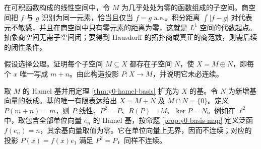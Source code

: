 \begin{example}[商空间消除积分中的代表元歧义]
在可积函数构成的线性空间中，令 $M$ 为几乎处处为零的函数组成的子空间。商空间把 $f$ 与 $g$ 识别为同一元素，恰当且仅当 $f=g$ a.e.。积分距离 $\int|f-g|$ 对代表元不敏感，并且在商空间中只有零元素的距离为零，这就是 $L^1$ 空间的代数起点。抽象商空间无需子空间闭；要得到 Hausdorff 的拓扑商或真正的商范数，则需后续的闭性条件。
\end{example}

\begin{exercise}[代数补空间与投影]
假设选择公理。证明每个子空间 $M\subseteq X$ 都存在子空间 $N$，使 $X=M\oplus N$，即每个 $x$ 唯一写成 $m+n$。由此构造投影 $P:X\to M$，并说明它未必连续。
\end{exercise}
\begin{solution}
取 $M$ 的 Hamel 基并用定理 \ref{thm:y0-hamel-basis} 扩充为 $X$ 的基。令 $N$ 为新增基向量的张成。基的唯一有限表达给出 $X=M+N$ 及 $M\cap N=\{0\}$。定义 $P(m+n)=m$，则 $P$ 线性、$P^2=P$、$R(P)=M$、$\ker P=N$。例如在 $\ell^2$ 中，取包含全部单位向量 $e_n$ 的 Hamel 基，按命题 \ref{prop:y0-basis-map} 定义泛函 $f(e_n)=n$，其余基向量取值为零。它在单位向量上无界，因而不连续；对应的投影 $P(x)=f(x)e_1$ 满足 $P^2=P$，同样不连续。
\end{solution}
